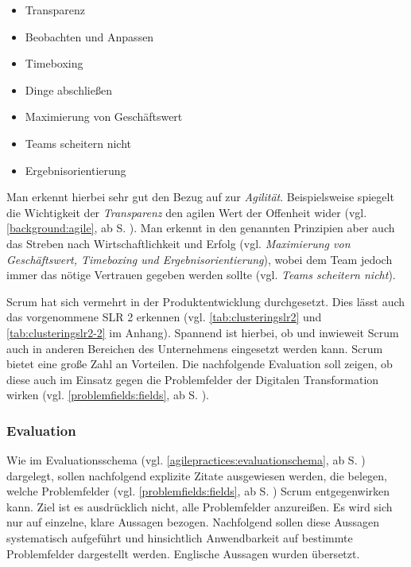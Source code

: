 \begin{itemize}[noitemsep, topsep=0pt]
	\item Transparenz
	\item Beobachten und Anpassen
	\item Timeboxing
	\item Dinge abschließen
	\item Maximierung von Geschäftswert
	\item Teams scheitern nicht
	\item Ergebnisorientierung
\end{itemize}

Man erkennt hierbei sehr gut den Bezug auf zur \textit{Agilität}. Beispielsweise spiegelt die Wichtigkeit der \textit{Transparenz} den agilen Wert der Offenheit wider (vgl. \ref{background:agile}, ab S. \pageref{background:agile}). Man erkennt in den genannten Prinzipien aber auch das Streben nach Wirtschaftlichkeit und Erfolg (vgl. \textit{Maximierung von Geschäftswert, Timeboxing und Ergebnisorientierung}), wobei dem Team jedoch immer das nötige Vertrauen gegeben werden sollte (vgl. \textit{Teams scheitern nicht}).

Scrum hat sich vermehrt in der Produktentwicklung durchgesetzt. Dies lässt auch das vorgenommene SLR 2 erkennen (vgl. \ref{tab:clusteringslr2} und \ref{tab:clusteringslr2-2} im Anhang). Spannend ist hierbei, ob und inwieweit Scrum auch in anderen Bereichen des Unternehmens eingesetzt werden kann. Scrum bietet eine große Zahl an Vorteilen. Die nachfolgende Evaluation soll zeigen, ob diese auch im Einsatz gegen die Problemfelder der Digitalen Transformation wirken (vgl. \ref{problemfields:fields}, ab S. \pageref{problemfields:fields}).

\subsubsection{Evaluation}

Wie im Evaluationsschema (vgl. \ref{agilepractices:evaluationschema}, ab S. \pageref{agilepractices:evaluationschema}) dargelegt, sollen nachfolgend explizite Zitate ausgewiesen werden, die belegen, welche  Problemfelder (vgl. \ref{problemfields:fields}, ab S. \pageref{problemfields:fields}) Scrum entgegenwirken kann. Ziel ist es ausdrücklich nicht, alle Problemfelder anzureißen. Es wird sich nur auf einzelne, klare Aussagen bezogen. Nachfolgend sollen diese Aussagen systematisch aufgeführt und hinsichtlich Anwendbarkeit auf bestimmte Problemfelder dargestellt werden. Englische Aussagen wurden übersetzt.

